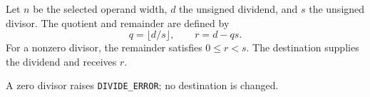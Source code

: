 Let \(n\) be the selected operand width, \(d\) the unsigned dividend, and \(s\) the unsigned divisor. The quotient and remainder are defined by
\[
  q = \lfloor d/s \rfloor,
  \qquad r = d - qs .
\]
For a nonzero divisor, the remainder satisfies \(0 \le r < s\). The destination supplies the dividend and receives \(r\).

A zero divisor raises \texttt{DIVIDE\_ERROR}; no destination is changed.
